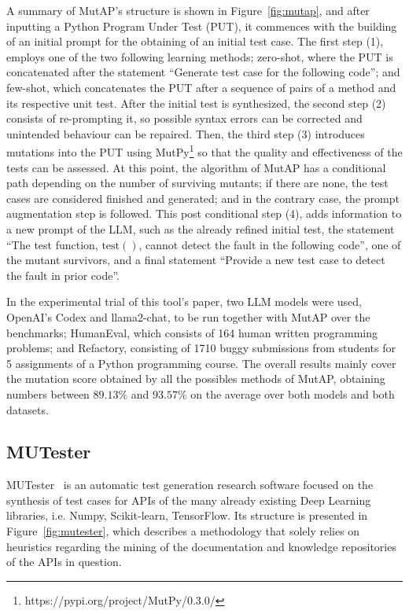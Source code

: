 \documentclass[%
  chapterprefix=false,%
  open=right,%
  twoside=true,%
  paper=a4,%
  logofile={Figures/logo.png},%
  thesistype=master,%
  UKenglish,%
]{se2thesis}
\begin{document}
A summary of MutAP's structure is shown in Figure~\ref{fig:mutap}, and after inputting a Python Program Under Test (PUT), it commences with the building of an initial prompt for the obtaining of an initial test case.
The first step (1), employs one of the two following learning methods; zero-shot, where the PUT is concatenated after the statement  ``Generate test case for the following code''; and few-shot, which concatenates the PUT after a sequence of pairs of a method and its respective unit test.
After the initial test is synthesized, the second step (2) consists of re-prompting it, so possible syntax errors can be corrected and unintended behaviour can be repaired.
Then, the third step (3) introduces mutations into the PUT using MutPy\footnote{https://pypi.org/project/MutPy/0.3.0/} so that the quality and effectiveness of the tests can be assessed.
At this point, the algorithm of MutAP has a conditional path depending on the number of surviving mutants; if there are none, the test cases are considered finished and generated; and in the contrary case, the prompt augmentation step is followed.
This post conditional step (4), adds information to a new prompt of the LLM, such as the already refined initial test, the statement ``The test function, \(\text{test}()\), cannot detect the fault in the
following code'', one of the mutant survivors, and a final statement ``Provide a new test case to detect the fault in prior code''.

In the experimental trial of this tool's paper, two LLM models were used, OpenAI's Codex and llama2-chat, to be run together with MutAP over the benchmarks; HumanEval, which consists of 164 human written programming problems; and Refactory, consisting of 1710 buggy submissions from students for 5 assignments of a Python programming course.
The overall results mainly cover the mutation score obtained by all the possibles methods of MutAP, obtaining numbers between \(89.13\%\) and \(93.57\%\) on the average over both models and both datasets.
\subsection{MUTester}

MUTester~\cite{DBLP:journals/corr/abs-2307-00404} is an automatic test generation research software focused on the synthesis of test cases for APIs of the many already existing Deep Learning libraries, i.e. Numpy, Scikit-learn, TensorFlow.
Its structure is presented in Figure~\ref{fig:mutester}, which describes a methodology that solely relies on heuristics regarding the mining of the documentation and knowledge repositories of the APIs in question. 
\end{document}
